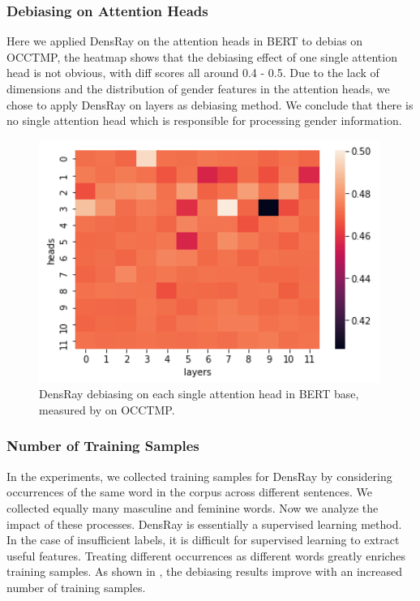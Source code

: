 \subsubsection{Debiasing on Attention Heads}
Here we applied DensRay on the attention heads in BERT to debias on OCCTMP, the heatmap  shows that the debiasing effect of one single attention head is not obvious, with diff scores all around 0.4 - 0.5. Due to the lack of dimensions and the distribution of gender features in the attention heads, we chose to apply DensRay on layers as debiasing method.
We conclude that there is no single attention head which is responsible for processing gender information.
\begin{figure}[h]
	\centering
	\includegraphics[width=0.9\linewidth]{heatmap_heads}
	\caption{DensRay debiasing on each single attention head in BERT base, measured by  on OCCTMP.}
\end{figure}


\subsubsection{Number of Training Samples}
In the experiments, we collected training samples for DensRay by considering  occurrences of the same word in the corpus across different sentences. We collected equally many masculine and feminine words. Now we analyze the impact of these processes.
DensRay is essentially a supervised learning method. In the case of insufficient labels, it is difficult for supervised learning to extract useful features. Treating different occurrences as different words greatly enriches training samples. As shown in , the debiasing results improve with an increased number of training samples.

